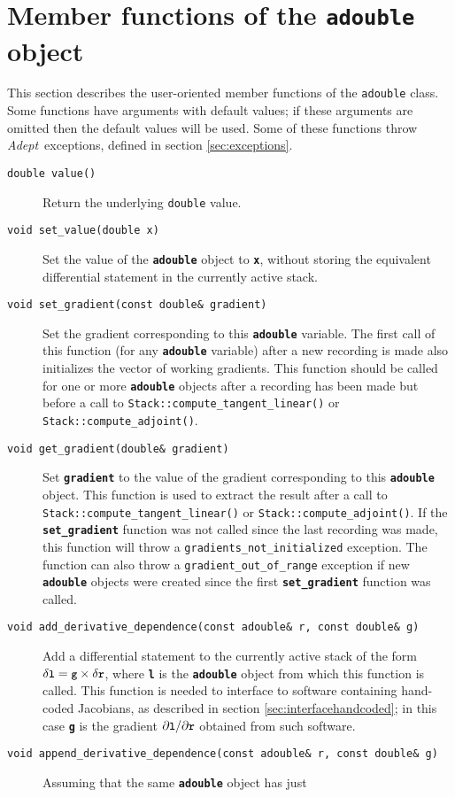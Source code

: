 \documentclass[a4,oneside]{book}
\def\codesize{\small}
\def\Adept{\emph{Adept}}
\def\code#1{{\codesize\texttt{#1}}}
\def\codebf#1{{\codesize\texttt{\textbf{#1}}}}
\def\citem#1{\item[{\codesize\texttt{#1}}]}
\def\codestyle#1{\texttt{#1}}
\begin{document}
\section{Member functions of the \codestyle{adouble} object}
\label{sec:adouble}
This section describes the user-oriented member functions of the
\code{adouble} class. Some functions have arguments with default
values; if these arguments are omitted then the default values will be
used. Some of these functions throw \Adept\ exceptions, defined in
section \ref{sec:exceptions}.
\begin{description}
\citem{double value()} Return the underlying \code{double} value.
%
\citem{void set\_value(double x)} Set the value of the \codebf{adouble}
object to \codebf{x}, without storing the equivalent differential
statement in the currently active stack.
%
\citem{void set\_gradient(const double\&\ gradient)} Set the
gradient corresponding to this \codebf{adouble} variable. The first call
of this function (for any \codebf{adouble} variable) after a new
recording is made also initializes the vector of working gradients.
This function should be called for one or more \codebf{adouble} objects
after a recording has been made but before a call to
\code{Stack::compute\_tangent\_linear()} or
\code{Stack::compute\_adjoint()}.
%
\citem{void get\_gradient(double\&\ gradient)} Set \codebf{gradient}
to the value of the gradient corresponding to this \codebf{adouble}
object. This function is used to extract the result after a call to
\code{Stack::compute\_tangent\_linear()} or
\code{Stack::compute\_adjoint()}. If the \codebf{set\_gradient} function
was not called since the last recording was made, this function will
throw a \code{gradients\_not\_initialized} exception.  The function
can also throw a \code{gradient\_out\_of\_range} exception if new
\codebf{adouble} objects were created since the first
\codebf{set\_gradient} function was called.
%
\citem{void add\_derivative\_dependence(const adouble\&\ r, const
  double\&\ g)} Add a differential statement to the currently active
stack of the form $\delta \codebf{l}=\codebf{g}\times\delta
\codebf{r}$, where \codebf{l} is the \codebf{adouble} object from which
this function is called.  This function is needed to interface to
software containing hand-coded Jacobians, as described in section
\ref{sec:interfacehandcoded}; in this case \codebf{g} is the gradient
$\partial\codebf{l}/\partial\codebf{r}$ obtained from such software.
%
\citem{void append\_derivative\_dependence(const adouble\&\ r, const
  double\&\ g)} Assuming that the same \codebf{adouble} object has just

\end{description}
\end{document}
